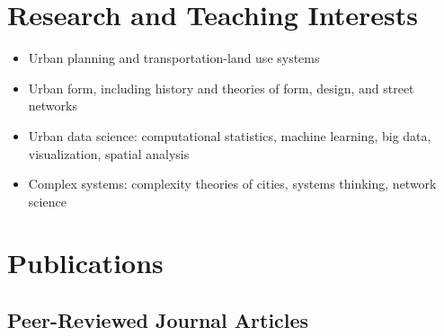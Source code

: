 \documentclass{academiccv}
\begin{document}
\section*{Research and Teaching Interests}

\begin{itemize}
	
\item Urban planning and transportation-land use systems

\item Urban form, including history and theories of form, design, and street networks

\item Urban data science: computational statistics, machine learning, big data, visualization, spatial analysis

\item Complex systems: complexity theories of cities, systems thinking, network science

\end{itemize}



\section*{Publications}

\subsection*{Peer-Reviewed Journal Articles}
\end{document}
